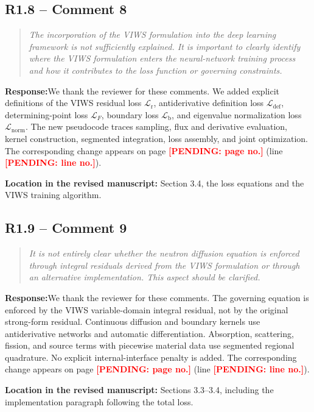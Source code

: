 \documentclass[11pt,a4paper]{article}
\newenvironment{reviewercomment}{\begin{quote}\small\itshape\color{commentgray}}{\end{quote}}
\newcommand{\authorresponse}{\noindent\textbf{Response:}\quad}
\newcommand{\revisionlocation}[1]{\par\noindent\textcolor{locationblue}{\textbf{Location in the revised manuscript: }}#1}
\newcommand{\draftplaceholder}[1]{\textcolor{red}{\textbf{[PENDING: #1]}}}
\begin{document}
\subsection*{R1.8 -- Comment 8}
\begin{reviewercomment}
The incorporation of the VIWS formulation into the deep learning framework is not sufficiently explained. It is important to clearly identify where the VIWS formulation enters the neural-network training process and how it contributes to the loss function or governing constraints.
\end{reviewercomment}
\authorresponse We thank the reviewer for these comments. We added explicit definitions of the VIWS residual loss $\mathcal L_{\mathrm r}$, antiderivative definition loss $\mathcal L_{\mathrm{def}}$, determining-point loss $\mathcal L_F$, boundary loss $\mathcal L_{\mathrm b}$, and eigenvalue normalization loss $\mathcal L_{\mathrm{norm}}$. The new pseudocode traces sampling, flux and derivative evaluation, kernel construction, segmented integration, loss assembly, and joint optimization. The corresponding change appears on page \draftplaceholder{page no.} (line \draftplaceholder{line no.}).
\revisionlocation{Section 3.4, the loss equations and the VIWS training algorithm.}

\subsection*{R1.9 -- Comment 9}
\begin{reviewercomment}
It is not entirely clear whether the neutron diffusion equation is enforced through integral residuals derived from the VIWS formulation or through an alternative implementation. This aspect should be clarified.
\end{reviewercomment}
\authorresponse We thank the reviewer for these comments. The governing equation is enforced by the VIWS variable-domain integral residual, not by the original strong-form residual. Continuous diffusion and boundary kernels use antiderivative networks and automatic differentiation. Absorption, scattering, fission, and source terms with piecewise material data use segmented regional quadrature. No explicit internal-interface penalty is added. The corresponding change appears on page \draftplaceholder{page no.} (line \draftplaceholder{line no.}).
\revisionlocation{Sections 3.3--3.4, including the implementation paragraph following the total loss.}
\end{document}
